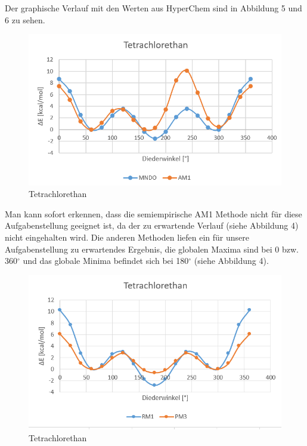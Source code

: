 Der graphische Verlauf mit den Werten aus HyperChem sind in Abbildung 5 und 6 zu sehen.

\begin{figure}[H]
    \centering
    \includegraphics[scale=.7]{../src/img/tetrachlorethan1.png}
    \caption{Tetrachlorethan}
\end{figure}

Man kann sofort erkennen, dass die semiempirische AM1 Methode nicht für diese Aufgabenstellung geeignet ist, da der zu erwartende Verlauf (siehe Abbildung 4)
nicht eingehalten wird. Die anderen Methoden liefen ein für unsere Aufgabenstellung zu erwartendes Ergebnis, die globalen Maxima sind bei 0 bzw. 360$^\circ$ und das globale 
Minima befindet sich bei 180$^\circ$ (siehe Abbildung 4). \\



\begin{figure}[H]
    \centering
    \includegraphics[scale=.7]{../src/img/tetrachlorethan2.png}
    \caption{Tetrachlorethan}
\end{figure}

